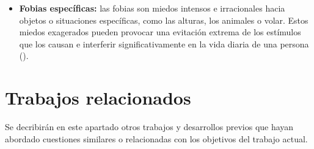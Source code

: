 \begin{itemize}
	\item \textbf{Fobias específicas:} las fobias son miedos intensos e irracionales hacia objetos o situaciones específicas, como las alturas, los animales o volar. Estos miedos exagerados pueden provocar una evitación extrema de los estímulos que los causan e interferir significativamente en la vida diaria de una persona (\cite{APA:2013}).
\end{itemize}





\section{Trabajos relacionados}

Se decribirán en este apartado otros trabajos y desarrollos previos que hayan abordado cuestiones similares o relacionadas con los objetivos del trabajo actual.

